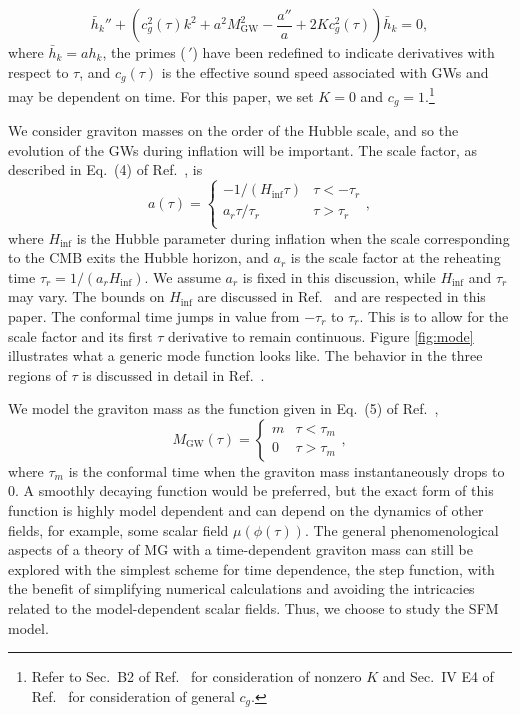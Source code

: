 \documentclass[prd,twocolumn,aps,psfig,nofootinbib,nobibnotes,superscriptaddress,preprintnumbers,times]{revtex4-2}
\begin{document}
\begin{equation}\label{eqn:eom}
    \bar{h}_k'' + \left(c_g^2(\tau) k^2 + a^2 M_\text{GW}^2 - \frac{a''}{a} + 2Kc_g^2(\tau)\right)\bar{h}_k = 0,
\end{equation}
where $\bar{h}_k = ah_k$, the primes ($\,'$) have been redefined to indicate derivatives with respect to $\tau$, and $c_g(\tau)$ is the effective sound speed associated with GWs and may be dependent on time. For this paper, we set $K = 0$ and $c_g = 1$.\footnote{Refer to Sec.\ B2 of Ref.\ \cite{Gumrukcuoglu:2012wt} for consideration of nonzero $K$ and Sec.\ IV E4 of Ref.\ \cite{Gumrukcuoglu:2012wt} for consideration of general $c_g$.}

We consider graviton masses on the order of the Hubble scale, and so the evolution of the GWs during inflation will be important.
The scale factor, as described in Eq.\ (4) of Ref.\ \cite{Fujita:2018ehq}, is
\begin{equation}\label{eqn:scale_fac}
    a(\tau) = 
    \begin{cases}
        -1/(H_{\inf}\tau) & \tau < -\tau_r \\
        a_r \tau/\tau_r & \tau > \tau_r \\
   \end{cases},
\end{equation}
where $H_{\inf}$ is the Hubble parameter during inflation when the scale corresponding to the CMB exits the Hubble horizon, and $a_r$ is the scale factor at the reheating time $\tau_r = 1/(a_r H_{\inf})$. We assume $a_r$ is fixed in this discussion, while $H_{\inf}$ and $\tau_r$ may vary. The bounds on $H_{\inf}$ are discussed in Ref.\ \cite{Jiang:2015qor} and are respected in this paper. The conformal time jumps in value from $-\tau_r$ to $\tau_r$. This is to allow for the scale factor and its first $\tau$ derivative to remain continuous. Figure \ref{fig:mode} illustrates what a generic mode function looks like. The behavior in the three regions of $\tau$ is discussed in detail in Ref.\ \cite{Fujita:2018ehq}.

We model the graviton mass as the function given in Eq.\ (5) of Ref.\ \cite{Fujita:2018ehq},
\begin{equation}\label{eqn:mass_case}
    M_\text{GW}(\tau) = 
    \begin{cases}
        m & \tau < \tau_m \\
        0 & \tau > \tau_m
   \end{cases},
\end{equation} 
where $\tau_m$ is the conformal time when the graviton mass instantaneously drops to 0. A smoothly decaying function would be preferred, but the exact form of this function is highly model dependent and can depend on the dynamics of other fields, for example, some scalar field $\mu(\phi(\tau))$. The general phenomenological aspects of a theory of MG with a time-dependent graviton mass can still be explored with the simplest scheme for time dependence, the step function, with the benefit of simplifying numerical calculations and avoiding the intricacies related to the model-dependent scalar fields. Thus, we choose to study the SFM model.
\end{document}
